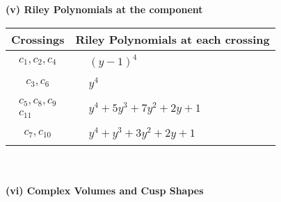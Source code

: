 \documentclass[1p]{elsarticle_modified}
\theoremstyle{definition}
\begin{document}
\newpage\renewcommand{\arraystretch}{1}
\flushleft \textbf{(v) Riley Polynomials at the component}\newline \\
\begin{tabular}{m{50pt}|m{274pt}}
Crossings & \hspace{64pt}Riley Polynomials at each crossing \\
\hline $$\begin{aligned}c_{1},c_{2},c_{4}\end{aligned}$$&$\begin{aligned}
&(y-1)^4
\end{aligned}$\\
\hline $$\begin{aligned}c_{3},c_{6}\end{aligned}$$&$\begin{aligned}
&y^4
\end{aligned}$\\
\hline $$\begin{aligned}c_{5},c_{8},c_{9}\\c_{11}\end{aligned}$$&$\begin{aligned}
&y^4+5 y^3+7 y^2+2 y+1
\end{aligned}$\\
\hline $$\begin{aligned}c_{7},c_{10}\end{aligned}$$&$\begin{aligned}
&y^4+y^3+3 y^2+2 y+1
\end{aligned}$\\
\hline
\end{tabular}\\~\\
\newpage\flushleft \textbf{(vi) Complex Volumes and Cusp Shapes}
\end{document}
